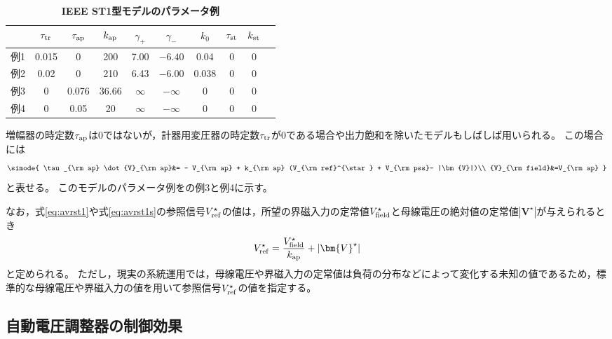 \documentclass[tombow,dvipdfmx]{corona-a5-1.1}
\begin{document}
\begin{table}[h]
\medskip
 \caption{\textbf{IEEE ST1型モデルのパラメータ例}}
 \label{table:AVRparast1}
 \centering
  \begin{tabular}{lccccccccc}
   \hline
 &  $\tau_{\rm tr}$ & $\tau_{\rm ap}$ & $k_{\rm ap}$ & $\gamma_{+}$ & $\gamma_{-}$ & $k_{0}$ & $\tau_{\rm st}$ & $k_{\rm st}$\\
   \hline \hline
   例1 \cite[8.6.3節]{kundur1994power}& 0.015 & 0 & 200 & 7.00 & $-6.40$ & 0.04 & 0 & 0\\
   例2 \cite[Table H.23]{ieee2016ieee}& 0.02 & 0 & 210 & 6.43 & $-6.00$ & 0.038 & 0 & 0 \\
   例3 \cite[V節]{chow2004power}& 0 & 0.076 & 36.66 & $\infty$ & $-\infty$ & 0 & 0 & 0 \\
   例4 \cite[Table 4]{sadamoto2019dynamic}& 0 & 0.05 & 20 & $\infty$ & $-\infty$ & 0 & 0 & 0 \\
   \hline
  \end{tabular}
\end{table}

増幅器の時定数$\tau_{\rm ap}$は0ではないが，計器用変圧器の時定数$\tau_{\rm tr}$が0である場合や出力飽和を除いたモデルもしばしば用いられる\cite{chow2004power,sauer2017power,sadamoto2019dynamic}。
この場合には
\begin{align}\label{eq:avrst1s}
\simode{
\tau_{\rm ap} \dot{V}_{\rm ap}&=
- V_{\rm ap} + k_{\rm ap} (V_{\rm ref}^{\star} + V_{\rm pss}- |\bm{V}|)\\
{V}_{\rm field}&=V_{\rm ap}
}
\end{align}
と表せる。
このモデルのパラメータ例をの例3と例4に示す。

なお，式\ref{eq:avrst1}や式\ref{eq:avrst1s}の参照信号$V_{{\rm ref}}^{\star}$の値は，所望の界磁入力の定常値$V_{{\rm field}}^{\star}$と母線電圧の絶対値の定常値$|\bm{V}^{\star}|$が与えられるとき
\begin{align}\label{eq:avrref}
V_{{\rm ref}}^{\star} = \frac{V_{{\rm field}}^{\star}}{k_{{\rm ap}}}+|\bm{V}^{\star}|
\end{align}
と定められる。
ただし，現実の系統運用では，母線電圧や界磁入力の定常値は負荷の分布などによって変化する未知の値であるため，標準的な母線電圧や界磁入力の値を用いて参照信号$V_{{\rm ref}}^{\star}$の値を指定する。


\subsection{自動電圧調整器の制御効果}
\end{document}
